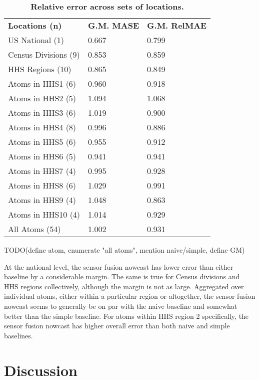 \documentclass[10pt,letterpaper]{article}
\newlength\savedwidth
\newcommand\thickhline{\noalign{\global\savedwidth\arrayrulewidth\global\arrayrulewidth 2pt}%
\hline
\noalign{\global\arrayrulewidth\savedwidth}}
\begin{document}
\begin{table}[!ht]
  \centering
  \caption{{\bf Relative error across sets of locations.}}
  \begin{tabular}{|l|l|l|}
    \hline
    {\bf Locations (n)} & {\bf G.M. MASE} & {\bf G.M. RelMAE}\\ \thickhline
    US National (1) & 0.667 & 0.799 \\ \hline
    Census Divisions (9) & 0.853 & 0.859 \\ \hline
    HHS Regions (10) & 0.865 & 0.849 \\ \hline
    Atoms in HHS1 (6) & 0.960 & 0.918 \\ \hline
    Atoms in HHS2 (5) & 1.094 & 1.068 \\ \hline
    Atoms in HHS3 (6) & 1.019 & 0.900 \\ \hline
    Atoms in HHS4 (8) & 0.996 & 0.886 \\ \hline
    Atoms in HHS5 (6) & 0.955 & 0.912 \\ \hline
    Atoms in HHS6 (5) & 0.941 & 0.941 \\ \hline
    Atoms in HHS7 (4) & 0.995 & 0.928 \\ \hline
    Atoms in HHS8 (6) & 1.029 & 0.991 \\ \hline
    Atoms in HHS9 (4) & 1.048 & 0.863 \\ \hline
    Atoms in HHS10 (4) & 1.014 & 0.929 \\ \hline
    All Atoms (54) & 1.002 & 0.931 \\ \hline
  \end{tabular}
  \begin{flushleft}
    TODO(define atom, enumerate "all atoms", mention naive/simple, define GM)
  \end{flushleft}
  \label{table_relative_metrics}
\end{table}

At the national level, the sensor fusion nowcast has lower error than either
baseline by a considerable margin. The same is true for Census divisions and
HHS regions collectively, although the margin is not as large. Aggregated over
individual atoms, either within a particular region or altogether, the sensor
fusion nowcast seems to generally be on par with the naive baseline and
somewhat better than the simple baseline. For atoms within HHS region 2
specifically, the sensor fusion nowcast has higher overall error than both
naive and simple baselines.

\section*{Discussion}
\end{document}
